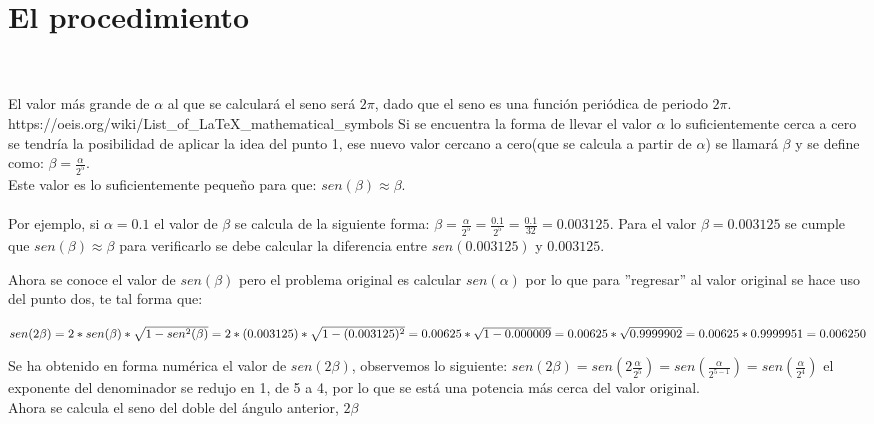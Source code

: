 \documentclass[letter,12pt]{article}
\newcommand{\Enmarca}[1]{{\centering\fbox{#1}\par}}
\begin{document}
\pagebreak
\section*{El procedimiento}
\ifx
{}\\\\
\fi
\ifx
El valor más grande de $\alpha$ al que se calculará el seno será $2\pi$, dado que el seno es una función periódica de periodo $2\pi$.\fi 
\ifx
https://oeis.org/wiki/List_of_LaTeX_mathematical_symbols
\fi
Si se encuentra la forma de llevar el valor $\alpha$ lo suficientemente cerca a cero se tendría la posibilidad de aplicar la idea del punto 1, ese nuevo valor cercano a cero(que se calcula a partir de $\alpha$) se llamará $\beta$ y se define como: 
$\beta=\frac{\alpha}{2^{5}}$.\\
Este valor es lo suficientemente pequeño para que: $sen(\beta)\approx\beta$. 
\\\\
Por ejemplo, si $\alpha=0.1$ el valor de $\beta$ se calcula de la siguiente forma: $\beta=\frac{\alpha}{2^{5}}=\frac{0.1}{2^{5}}=\frac{0.1}{32}=0.003125$. Para el valor $\beta=0.003125$ se cumple que $sen(\beta)\approx\beta$ para verificarlo se debe calcular la diferencia entre $sen(0.003125)$ y $0.003125$.


{
\centering
{}\par
}

Ahora se conoce el valor de $sen(\beta)$ pero el problema original es calcular $sen(\alpha)$ por lo que para ''regresar'' al valor original se hace uso del punto dos, te tal forma que:

$sen(2\beta)=2*sen(\beta)*\sqrt{1-sen^2(\beta)}=\\
2*(0.003125)*\sqrt{1-(0.003125)^2}=\\
0.00625*\sqrt{1-0.000009}=\\
0.00625*\sqrt{0.9999902}=\\
0.00625*0.9999951=0.006250$

\Enmarca{$sen(2\beta)=0.006250$}

Se ha obtenido en forma numérica el valor de $sen(2\beta)$, observemos lo siguiente:
$sen(2\beta)=sen(2\frac{\alpha}{2^{5}})=sen(\frac{\alpha}{2^{5-1}})=sen(\frac{\alpha}{2^{4}})$ el exponente del denominador se redujo en 1, de 5 a 4, por lo que se está una potencia más cerca del valor original. \\
Ahora se calcula el seno del doble del ángulo anterior, $2\beta$
\end{document}
